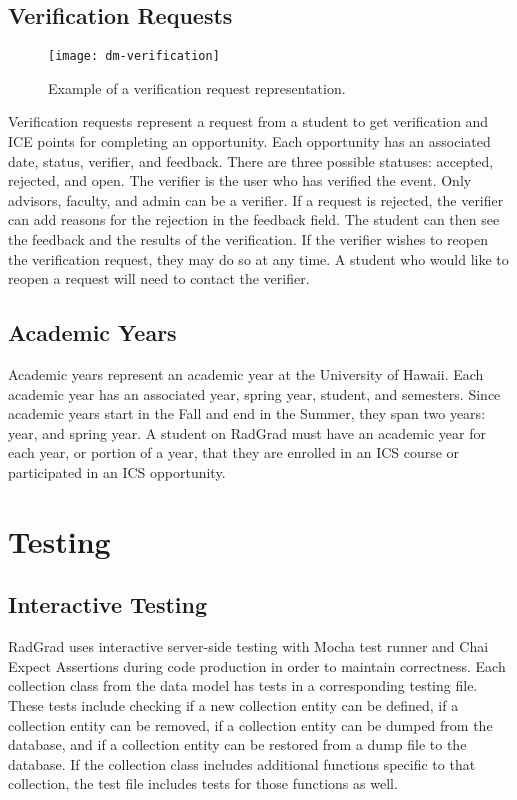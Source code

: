 \subsection{Verification Requests}
\begin{figure}[h]
\centering
\texttt{[image: dm-verification]}
\caption{Example of a verification request representation.}
\end{figure}
Verification requests represent a request from a student to get verification and ICE points for completing an opportunity. Each opportunity has an associated date, status, verifier, and feedback. There are three possible statuses: accepted, rejected, and open. The verifier is the user who has verified the event. Only advisors, faculty, and admin can be a verifier. If a request is rejected, the verifier can add reasons for the rejection in the feedback field. The student can then see the feedback and the results of the verification. If the verifier wishes to reopen the verification request, they may do so at any time. A student who would like to reopen a request will need to contact the verifier.  

\subsection{Academic Years}
Academic years represent an academic year at the University of Hawaii. Each academic year has an associated year, spring year, student, and semesters. Since academic years start in the Fall and end in the Summer, they span two years: year, and spring year. A student on RadGrad must have an academic year for each year, or portion of a year, that they are enrolled in an ICS course or participated in an ICS opportunity.

\section{Testing}
\subsection{Interactive Testing}
RadGrad uses interactive server-side testing with Mocha test runner and Chai Expect Assertions during code production in order to maintain correctness. Each collection class from the data model has tests in a corresponding testing file. These tests include checking if a new collection entity can be defined, if a collection entity can be removed, if a collection entity can be dumped from the database, and if a collection entity can be restored from a dump file to the database. If the collection class includes additional functions specific to that collection, the test file includes tests for those functions as well.

